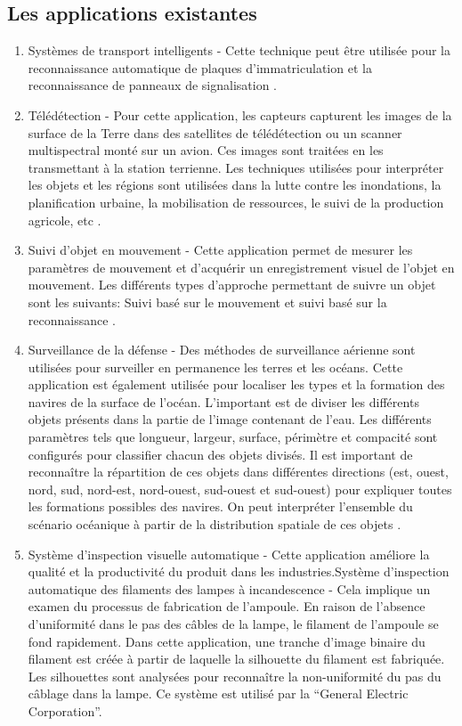 \documentclass[12pt]{article}
\begin{document}
\subsection{Les applications existantes}
\begin{enumerate}
	\item Systèmes de transport intelligents - Cette technique peut être utilisée pour la reconnaissance automatique de plaques d'immatriculation et la reconnaissance de panneaux de signalisation \cite{15}.
	\item Télédétection - Pour cette application, les capteurs capturent les images de la surface de la Terre dans des satellites de télédétection ou un scanner multispectral monté sur un avion. Ces images sont traitées en les transmettant à la station terrienne. Les techniques utilisées pour interpréter les objets et les régions sont utilisées dans la lutte contre les inondations, la planification urbaine, la mobilisation de ressources, le suivi de la production agricole, etc \cite{16}.
	\item Suivi d'objet en mouvement - Cette application permet de mesurer les paramètres de mouvement et d'acquérir un enregistrement visuel de l'objet en mouvement. Les différents types d’approche permettant de suivre un objet sont les suivants: Suivi basé sur le mouvement et suivi basé sur la reconnaissance \cite{17}.
	\item Surveillance de la défense - Des méthodes de surveillance aérienne sont utilisées pour surveiller en permanence les terres et les océans. Cette application est également utilisée pour localiser les types et la formation des navires de la surface de l'océan. L'important est de diviser les différents objets présents dans la partie de l'image contenant de l'eau. Les différents paramètres tels que longueur, largeur, surface, périmètre et compacité sont configurés pour classifier chacun des objets divisés. Il est important de reconnaître la répartition de ces objets dans différentes directions (est, ouest, nord, sud, nord-est, nord-ouest, sud-ouest et sud-ouest) pour expliquer toutes les formations possibles des navires. On peut interpréter l'ensemble du scénario océanique à partir de la distribution spatiale de ces objets \cite{18}.
	\item Système d'inspection visuelle automatique - Cette application améliore la qualité et la productivité du produit dans les industries.Système d’inspection automatique des filaments des lampes à incandescence - Cela implique un examen du processus de fabrication de l'ampoule. En raison de l’absence d’uniformité dans le pas des câbles de la lampe, le filament de l’ampoule se fond rapidement. Dans cette application, une tranche d'image binaire du filament est créée à partir de laquelle la silhouette du filament est fabriquée. Les silhouettes sont analysées pour reconnaître la non-uniformité du pas du câblage dans la lampe. Ce système est utilisé par la “General Electric Corporation”.

\end{enumerate}
\end{document}
